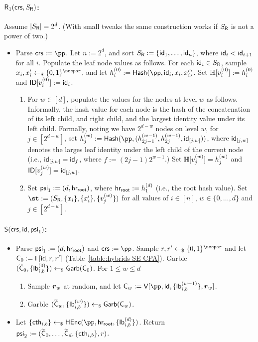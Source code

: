 \begin{construction}
\paragraph{$\mathsf{R}_1(\mathsf{crs},S_{\mathsf{R}})$:}  Assume $|S_{\mathsf{R}}| = 2^d$. (With small tweaks the same construction works if $S_{\mathsf{R}}$ is not a power of two.)
\begin{itemize}
    \item  Parse $\crs:=\pp$. Let $n := 2^d$, and sort  $S_{\mathsf{R}} := \{\mathsf{id}_1, \dots , \mathsf{id}_n\}$, where $\mathsf{id}_i < \mathsf{id}_{i+1} $ for all $i$. Populate the leaf node values as follows. For each   $\mathsf{id}_i \in S_{\mathsf{R}}$,  sample $x_i , x'_i \pick \bits^\secpar$, and let $h_i^{(0)} :=  \Hash(\pp, \id_i, x_i , x'_i)$. Set $\mathbb{H}[v^{(0)}_i] := h_i^{(0)}$ and $\mathsf{ID}[v^{(0)}_i] := \mathsf{id}_i$.
    \begin{enumerate}
       \item For $w \in [d]$, populate the values for the nodes at level $w$ as follows. Informally, the hash value for each node is the hash of the concatenation of its left child, and right child, and the largest identity value under its left child. Formally, noting we have $2^{d-w}$ nodes on level $w$, for $j \in [2^{d-w}]$,  set $h^{(w)}_j:= \Hash(\pp, (h^{(w-1)}_{2j-1}, h^{(w-1)}_{2j}, \id_{[j,w]} )) $, where $\mathsf{id}_{[j,w]}$ denotes the larges leaf identity  under the left child of the current node (i.e., $\mathsf{id}_{[j,w]} = \mathsf{id}_f$, where $ f:= (2j-1)2^{w-1}$.) Set  $\mathbb{H}[v^{(w)}_j] = h_j^{(w)}$ and $\mathsf{ID}[v^{(w)}_j] = \mathsf{id}_{[j,w]}$.
       \item Set $\mathsf{psi}_1 := (d , \mathsf{hr_{root}})$, where $\mathsf{hr_{root}} := h_1^{(d)}$ (i.e., the root hash value). Set $\st := (S_\Rs , \{x_i \} , \{ x'_i\} ,  \{v_j^{(w)} \})$ for all  values of $i \in [n]$, $w \in \{0, \dots , d\}$ and  $j \in  [2^{d-w}]$. %
   \end{enumerate}
       \end{itemize}
      
 
   
   \paragraph{$\mathsf{S}(\mathsf{crs}, \mathsf{id},\mathsf{psi}_1)$:}
   \begin{itemize}
       \item Parse $ \mathsf{psi}_1 :=  (d , \mathsf{hr_{root}} ) $ and $\crs:=\pp$. Sample $r, r' \pick \bits^\secpar$  and let $\mathsf{C}_0 := \mathsf{F}[\mathsf{id}, r , r']$ (Table~\ref{table:hybrids-SE-CPA}). Garble $(\widetilde{\mathsf{C}}_0 , \{\mathsf{lb}_{i,b}^{(0)} \}) \leftarrow_\$ \mathsf{Garb}(\mathsf{C}_0)$. For $1 \leq w \leq d$ 
       \begin{enumerate}
           \item Sample $\boldsymbol{r}_w$ at random, and let $\al{C}_w := \al{V}[\pp , \id,  \{\lb_{i,b}^{(w-1)}\},   \bo{r}_w]$. 
           \item Garble  $(\widetilde{\mathsf{C}}_w , \{\mathsf{lb}_{i,b}^{(w)} \}) \leftarrow_\$ \mathsf{Garb}(\mathsf{C}_w)$.
       \end{enumerate}
      \item  Let $\{\cth_{i,b} \} \pick \HEnc(\pp, \hr, \{\lb_{i,b}^{(d)} \} )$. Return $\mathsf{psi}_2 := (\widetilde{\mathsf{C}}_0, \dots , \widetilde{\mathsf{C}}_{d} , \{\mathsf{cth}_{i,b} \} , r)$.
   \end{itemize} 
 

\end{construction}
